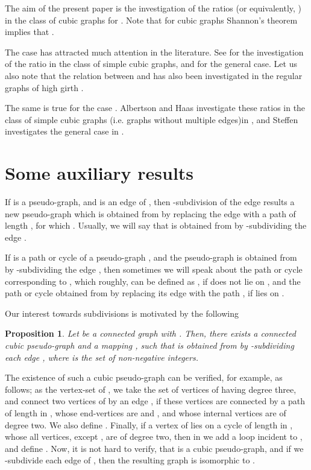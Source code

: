 \documentclass[fleqn,12pt,twoside]{article}
\newtheorem{proposition}{Proposition}
\newenvironment{proof}[1][Proof.]{\begin{trivlist}
\item[\hskip \labelsep {\bfseries #1}]}{\end{trivlist}}
\begin{document}
The aim of the present paper is the investigation of the ratios  (or equivalently, ) in the class of cubic graphs for . Note that for cubic graphs  Shannon's theorem implies
that  .

The case  has attracted much attention in the literature. See \cite {Hobbs} for the investigation of the ratio in the class of simple
cubic graphs, and
\cite{Bella,HenningYeo,TakaoBaybars,Takao,Weinstein} for the
general case. Let us also note that the relation between  and  has also been investigated in the regular
graphs of high girth \cite{GirthBound}.

The same is true for the case . Albertson and Haas
investigate these ratios in the class of simple cubic graphs (i.e.
graphs without multiple edges)in \cite
{AlbertsonHaasFirst,AlbertsonHaasSecond}, and Steffen investigates
the general case in \cite{Steffen}.

\section{Some auxiliary results}

If  is a pseudo-graph, and  is an edge of , then -subdivision of the edge  results a new pseudo-graph  which
is obtained from  by replacing the edge  with a path 
of length , for which . Usually, we
will say that  is obtained from  by -subdividing the edge
.

If  is a path or cycle of a pseudo-graph , and the pseudo-graph  is obtained from  by -subdividing the edge , then
sometimes we will speak about the path or cycle  corresponding
to , which roughly, can be defined as , if  does not lie on
, and
the path or cycle obtained from  by replacing its edge  with the path , if  lies on .

Our interest towards subdivisions is motivated by the following

\begin{proposition}
\label{CubicPseudoGraph}Let  be a connected graph with . Then, there exists a connected cubic pseudo-graph  and a mapping , such that  is
obtained from  by -subdividing each edge ,
where  is the set of non-negative integers.
\end{proposition}
\begin{proof}The existence of such a cubic pseudo-graph  can be verified,
for example, as follows; as the vertex-set of , we take the set
of vertices of  having degree three, and connect two vertices
 of  by an edge , if these vertices are connected
by a path  of length  in , whose end-vertices are
 and , and whose internal vertices are of degree two. We also
define . Finally, if a vertex  of  lies on a cycle
 of length  in , whose all vertices, except , are
of degree two, then in  we add a loop  incident to , and
define . Now, it is not hard to verify, that  is a
cubic pseudo-graph, and if we -subdivide each edge  of
, then the resulting graph is isomorphic to .
\end{proof}
\end{document}
